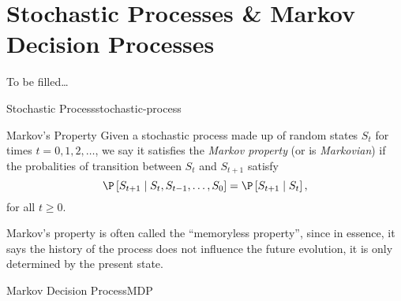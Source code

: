 \chapter{Stochastic Processes \& Markov Decision Processes}
\label{chapter:Stochastic}

To be filled\ldots



\begin{dfn}{Stochastic Process}{stochastic-process}
\end{dfn}

\begin{dfn}{Markov's Property}
    Given a stochastic process made up of random states $S_t$ for times $t = 0,
    1, 2, \dots$, we say it satisfies the \emph{Markov property} (or is
    \emph{Markovian}) if the probalities of transition between $S_t$ and
    $S_{t+1}$ satisfy
    \begin{equation*}
        \P \left[ S_{t+1} \mid S_t, S_{t-1}, \dots, S_0 \right] = \P \left[ S_{t+1} \mid S_t \right],
    \end{equation*}
    for all $t \geq 0$.
\end{dfn}

Markov's property is often called the ``memoryless property'', since in essence,
it says the history of the process does not influence the future evolution, it
is only determined by the present state.

\begin{dfn}{Markov Decision Process}{MDP}
\end{dfn}